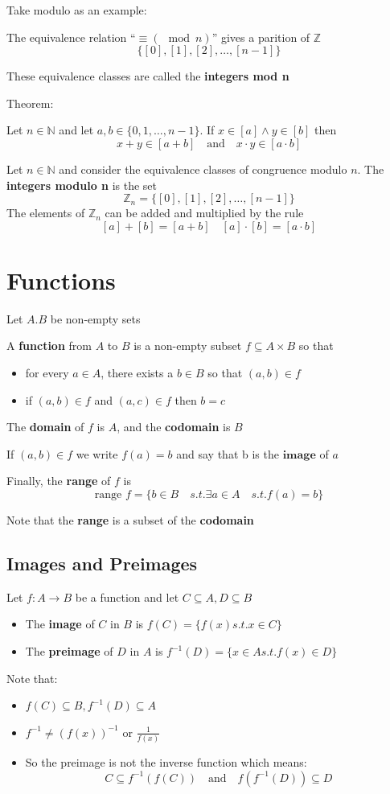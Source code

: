\documentclass[letterpaper,12pt]{article}
\begin{document}
Take modulo as an example:

The equivalence relation ``$\equiv (\mod n)$'' gives a parition of $\mathbb{Z}$
\[\{[0],[1],[2],\ldots,[n-1]\}\]

These equivalence classes are called the \textbf{integers mod n}

Theorem:

Let $n\in\mathbb{N}$ and let $a,b\in \{0,1,\ldots,n-1\}$. If $x\in[a]\land y\in [b]$ then 
\[x+y\in[a+b]\quad \text{and} \quad x\cdot y \in [a\cdot b]\]

Let $n\in \mathbb{N}$ and consider the equivalence classes of congruence modulo $n$. The \textbf{integers modulo n} is the set 
\[\mathbb{Z}_n=\{[0],[1],[2],\ldots,[n-1]\}\]
The elements of $\mathbb{Z}_n$ can be added and multiplied by the rule
\[[a]+[b]=[a+b]\quad [a]\cdot [b]=[a\cdot b]\]

\section{Functions}

Let $A.B$ be non-empty sets

A \textbf{function} from $A$ to $B$ is a non-empty subset $f\subseteq A\times B$ so that
\begin{itemize}
    \item for every $a\in A$, there exists a $b\in B$ so that $(a,b)\in f$
    \item if $(a,b)\in f$ and $(a,c) \in f$ then $b=c$
\end{itemize}
The \textbf{domain} of $f$ is $A$, and the \textbf{codomain} is $B$

If $(a,b)\in f$ we write $f(a)=b$ and say that b is the $\textbf{image}$ of $a$

Finally, the \textbf{range} of $f$ is 
\[\text{range }f=\{b\in B\quad s.t.\exists a\in A \quad s.t. f(a)=b\}\]

Note that the \textbf{range} is a subset of the \textbf{codomain}

\subsection{Images and Preimages}
Let $f:A \to B$ be a function and let $C\subseteq A, D\subseteq B$
\begin{itemize}
    \item The \textbf{image} of $C$ in $B$ is $f(C)=\{f(x)s.t.x\in C\}$
    \item The \textbf{preimage} of $D$ in $A$ is $f^{-1}(D)=\{x\in A s.t. f(x)\in D\}$
\end{itemize}
Note that:
\begin{itemize}
    \item $f(C)\subseteq B, f^{-1}(D)\subseteq A$
    \item $f^{-1}\neq (f(x))^{-1}$ or $\frac{1}{f(x)}$
    \item So the preimage is not the inverse function which means:
    \[C\subseteq f^{-1}(f(C))\quad \text{and} \quad f(f^{-1}(D))\subseteq D\]
\end{itemize}
\end{document}

